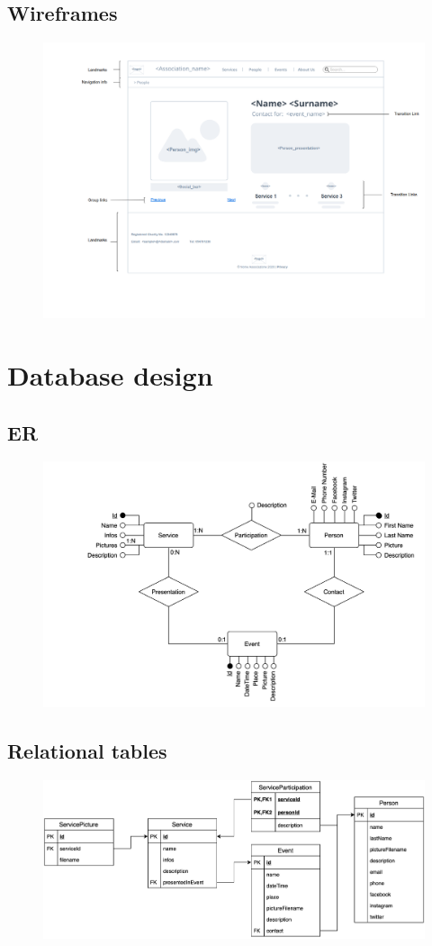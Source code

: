 \documentclass[a4paper, 11pt, parskip=half, headsepline]{scrreprt}
\begin{document}
\section{Wireframes}

\begin{figure}[H]
    \centering
    \includegraphics[width=\linewidth, keepaspectratio]{wireframes/KindOfTopic-Person}
    \caption{}
    \label{fig:wireframe_single_person}
\end{figure}


\chapter{Database design}

\section{ER}

\begin{figure}[H]
    \centering
    \includegraphics[width=0.79\linewidth, keepaspectratio]{DB/ER}
\end{figure}

\section{Relational tables}

\begin{figure}[H]
    \centering
    \includegraphics[width=0.79\linewidth, keepaspectratio]{DB/RelationalTables}
\end{figure}
\end{document}

